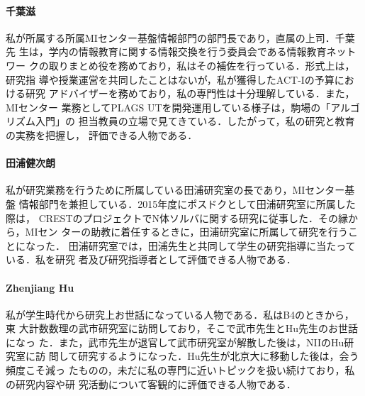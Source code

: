 \documentclass[dvipdfmx]{jsarticle}
\begin{document}
\paragraph{千葉滋}
私が所属する所属MIセンター基盤情報部門の部門長であり，直属の上司．千葉先
生は，学内の情報教育に関する情報交換を行う委員会である情報教育ネットワー
クの取りまとめ役を務めており，私はその補佐を行っている．形式上は，研究指
導や授業運営を共同したことはないが，私が獲得したACT-Iの予算における研究
アドバイザーを務めており，私の専門性は十分理解している．また，MIセンター
業務としてPLAGS UTを開発運用している様子は，駒場の「アルゴリズム入門」の
担当教員の立場で見てきている．したがって，私の研究と教育の実務を把握し，
評価できる人物である．

\paragraph{田浦健次朗}
私が研究業務を行うために所属している田浦研究室の長であり，MIセンター基盤
情報部門を兼担している．2015年度にポスドクとして田浦研究室に所属した際は，
CRESTのプロジェクトでN体ソルバに関する研究に従事した．その縁から，MIセン
ターの助教に着任するときに，田浦研究室に所属して研究を行うことになった．
田浦研究室では，田浦先生と共同して学生の研究指導に当たっている．私を研究
者及び研究指導者として評価できる人物である．

\paragraph{Zhenjiang Hu}
私が学生時代から研究上お世話になっている人物である．私はB4のときから，東
大計数数理の武市研究室に訪問しており，そこで武市先生とHu先生のお世話になっ
た．また，武市先生が退官して武市研究室が解散した後は，NIIのHu研究室に訪
問して研究するようになった．Hu先生が北京大に移動した後は，会う頻度こそ減っ
たものの，未だに私の専門に近いトピックを扱い続けており，私の研究内容や研
究活動について客観的に評価できる人物である．
\end{document}
